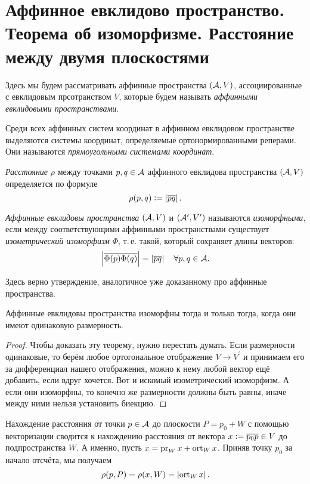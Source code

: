 \section{Аффинное евклидово пространство. Теорема об изоморфизме. Расстояние между двумя
плоскостями}

Здесь мы будем рассматривать аффинные пространства $(\mathcal{A}, V)$, ассоциированные с евклидовым прсотранством $V$, которые будем называть \textit{аффинными евклидовыми пространствами}.

Среди всех аффинных систем координат в аффинном евклидовом пространстве выделяются системы координат, определяемые ортонормированными реперами. Они называются \textit{прямоугольными системами координат}.

\begin{definition}
    \textit{Расстояние} $\rho$ между точками $p, q \in \mathcal{A}$ аффинного евклидова пространства $(\mathcal{A}, V)$ определяется по формуле
    \[
        \rho(p, q) \vcentcolon = \left\lvert\overline{pq}\right\rvert.
    \]
\end{definition}

\begin{definition}
    \textit{Аффинные евклидовы пространства} $(\mathcal{A}, V)$ и $(\mathcal{A}^\prime, V^\prime)$ называются \textit{изоморфными}, если между соответствующими аффинными пространствами существует \textit{изометрический изоморфизм} $\Phi$, т.\,е. такой, который сохраняет длины векторов:
    \[
        \left\lvert\overline{\Phi(p)\Phi(q)}\right\rvert = \left\lvert\overline{pq}\right\rvert\quad\forall p, q \in \mathcal{A}.
    \]
\end{definition}

Здесь верно утверждение, аналогичное уже доказанному про аффинные пространства.

\begin{theorem}[Об изоморфизме]
    Аффинные евклидовы пространства изоморфны тогда и только тогда, когда они имеют одинаковую размерность.
\end{theorem}

\begin{proof}
    Чтобы доказать эту теорему, нужно перестать думать. Если размерности одинаковые, то берём любое ортогональное отображение $V \to V^\prime$ и принимаем его за дифференциал нашего отображения, можно к нему любой вектор ещё добавить, если вдруг хочется. Вот и искомый изометрический изоморфизм. А если они изоморфны, то конечно же размерности должны быть равны, иначе между ними нельзя установить биекцию.
\end{proof}

Нахождение расстояния от точки $p \in \mathcal{A}$ до плоскости $P = p_0 + W$ с помощью векторизации сводится к нахождению расстояния от вектора $x \vcentcolon = \overline{p_0p} \in V$ до подпространства $W$. А именно, пусть $x = \operatorname{pr}_Wx + \operatorname{ort}_Wx$. Приняв точку $p_0$ за начало отсчёта, мы получаем
\[
    \rho(p, P) = \rho(x, W) = \left\lvert\operatorname{ort}_Wx\right\rvert.
\]

